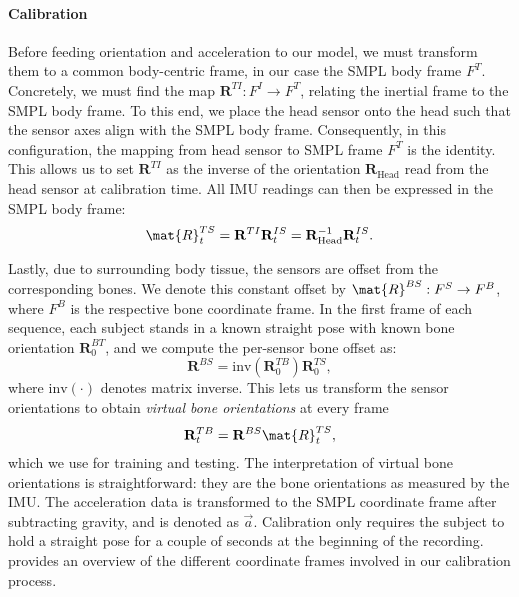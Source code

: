 \documentclass[acmtog]{acmart}
\begin{document}
\paragraph{Calibration} Before feeding orientation and acceleration to our model, we must transform them to a common body-centric frame, in our case the SMPL body frame $F^T$. Concretely, we must find the map $\mathbf{R}^{TI} : F^I \rightarrow F^T$, relating the inertial frame to the SMPL body frame. To this end, we place the head sensor onto the head such that the sensor axes align with the SMPL body frame.  Consequently, in this configuration, the mapping from  head sensor to SMPL frame $F^T$ is the identity.
This allows us to set $\mathbf{R}^{TI}$  as the inverse of the orientation $\mathbf{R}_\mathrm{Head}$ read from the head sensor at calibration time. All IMU readings can then be expressed in the SMPL body frame:
\begin{equation}
\mat{R}^{TS}_t = \mathbf{R}^{TI}\mathbf{R}^{IS}_t = \mathbf{R}^{-1}_\mathrm{Head} \mathbf{R}^{IS}_t  .
\end{equation}

Lastly, due to surrounding body tissue, the sensors are offset from the corresponding bones. We denote this constant offset by $\mat{R}^{BS}: F^S \rightarrow F^B$, where $F^B$ is the respective bone coordinate frame. In the first frame of each sequence, each subject stands in a known straight pose with known bone orientation $\mathbf{R}^{BT}_0$, and we compute the per-sensor bone offset as:
\begin{equation}
\mathbf{R}^{BS} = \mathrm{inv}(\mathbf{R}^{TB}_0)\mathbf{R}^{TS}_0,
\end{equation}
where $\mathrm{inv}(\cdot)$ denotes matrix inverse. This lets us transform the sensor orientations to obtain \emph{virtual bone orientations} at every frame 
\begin{equation}
\mathbf{R}^{TB}_t = \mathbf{R}^{BS}\mat{R}^{TS}_t , \label{eq:virtual_bone_orientations}
\end{equation}
which we use for training and testing. The interpretation of virtual bone orientations is straightforward: they are the bone orientations as measured by the IMU. The acceleration data is transformed to the SMPL coordinate frame after subtracting gravity, and is denoted as $\vec{a}$. Calibration only requires the subject to hold a straight pose for a couple of seconds at the beginning of the recording.  provides an overview of the different coordinate frames involved in our calibration process. 
\end{document}
